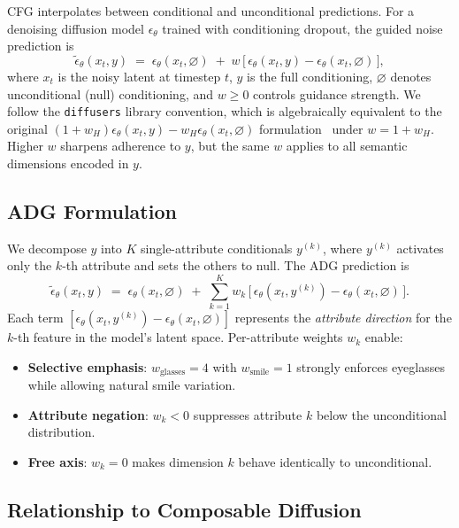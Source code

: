 \documentclass{article}
\begin{document}
CFG interpolates between conditional and unconditional predictions. For a denoising diffusion model $\epsilon_\theta$ trained with conditioning dropout, the guided noise prediction is
\begin{equation}
\tilde{\epsilon}_\theta(x_t, y) \;=\; \epsilon_\theta(x_t, \varnothing) \;+\; w\,\bigl[\,\epsilon_\theta(x_t, y) - \epsilon_\theta(x_t, \varnothing)\,\bigr],
\label{eq:cfg}
\end{equation}
where $x_t$ is the noisy latent at timestep $t$, $y$ is the full conditioning, $\varnothing$ denotes unconditional (null) conditioning, and $w \geq 0$ controls guidance strength. We follow the \texttt{diffusers} library convention, which is algebraically equivalent to the original $(1+w_H)\epsilon_\theta(x_t,y) - w_H\epsilon_\theta(x_t,\varnothing)$ formulation~\citep{ho2022cfg} under $w = 1 + w_H$. Higher $w$ sharpens adherence to $y$, but the same $w$ applies to all semantic dimensions encoded in $y$.

\subsection{ADG Formulation}

We decompose $y$ into $K$ single-attribute conditionals $y^{(k)}$, where $y^{(k)}$ activates only the $k$-th attribute and sets the others to null. The ADG prediction is
\begin{equation}
\tilde{\epsilon}_\theta(x_t, y) \;=\; \epsilon_\theta(x_t, \varnothing) \;+\; \sum_{k=1}^K w_k \,\bigl[\,\epsilon_\theta(x_t, y^{(k)}) - \epsilon_\theta(x_t, \varnothing)\,\bigr].
\label{eq:adg}
\end{equation}
Each term $[\epsilon_\theta(x_t, y^{(k)}) - \epsilon_\theta(x_t, \varnothing)]$ represents the \emph{attribute direction} for the $k$-th feature in the model's latent space. Per-attribute weights $w_k$ enable:
\begin{itemize}
\item \textbf{Selective emphasis}: $w_{\text{glasses}} = 4$ with $w_{\text{smile}} = 1$ strongly enforces eyeglasses while allowing natural smile variation.
\item \textbf{Attribute negation}: $w_k < 0$ suppresses attribute $k$ below the unconditional distribution.
\item \textbf{Free axis}: $w_k = 0$ makes dimension $k$ behave identically to unconditional.
\end{itemize}

\subsection{Relationship to Composable Diffusion}
\end{document}
